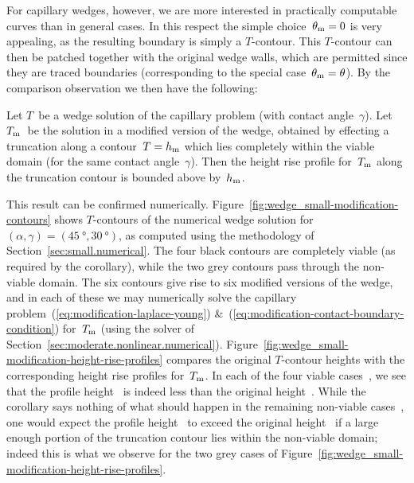 For capillary wedges, however,
we are more interested in practically computable curves
than in general cases.
In this respect
the simple choice~$\theta_{\mathrm{m}} = 0$ is very appealing,
as the resulting boundary is simply a $T$-contour.
This $T$-contour can then be patched together
with the original wedge walls,
which are permitted since they are traced boundaries
(corresponding to the special case~$\theta_{\mathrm{m}} = \theta$).
By the comparison observation we then have the following:
\begin{corollary*}
  Let $T$~be a wedge solution of the capillary problem
  (with contact angle~$\gamma$).
  Let $T_{\mathrm{m}}$~be the solution in a modified version of the wedge,
  obtained by effecting a truncation along a contour~$T = h_{\mathrm{m}}$
  which lies completely within the viable domain
  (for the same contact angle~$\gamma$).
  Then the height rise profile for~$T_{\mathrm{m}}$ along the truncation contour
  is bounded above by~$h_{\mathrm{m}}$.
\end{corollary*}
This result can be confirmed numerically.
Figure~\ref{fig:wedge_small-modification-contours}
shows $T$-contours of the numerical wedge solution
for~$(\alpha, \gamma) = (\SI{45}{\degree}, \SI{30}{\degree})$,
as computed using the methodology of Section~\ref{sec:small.numerical}.
The four black contours are completely viable
(as required by the corollary),
while the two grey contours pass through the non-viable domain.
The six contours give rise to six modified versions of the wedge,
and in each of these we may numerically solve
the capillary problem~(\ref{eq:modification-laplace-young})
\&~(\ref{eq:modification-contact-boundary-condition})
for~$T_{\mathrm{m}}$
(using the solver of Section~\ref{sec:moderate.nonlinear.numerical}).
Figure~\ref{fig:wedge_small-modification-height-rise-profiles}
compares the original $T$-contour heights
with the corresponding height rise profiles for~$T_{\mathrm{m}}$.
In each of the four viable cases~,
we see that the profile height~
is indeed less than the original height~.
While the corollary says nothing of what should happen
in the remaining non-viable cases~,
one would expect the profile height~
to exceed the original height~
if a large enough portion of the truncation contour
lies within the non-viable domain;
indeed this is what we observe
for the two grey cases
of Figure~\ref{fig:wedge_small-modification-height-rise-profiles}.

